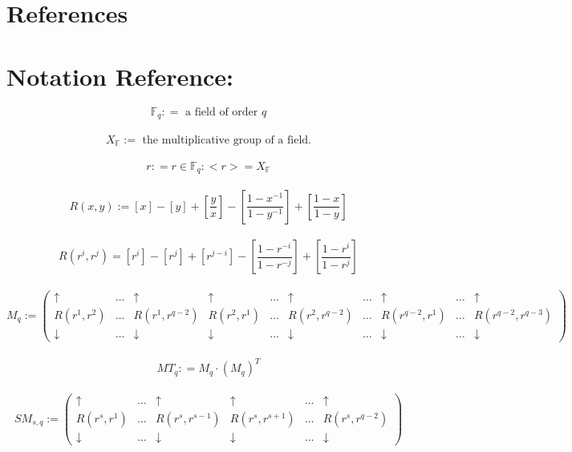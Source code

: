 \documentclass[11pt]{article}
\theoremstyle{plain}
\theoremstyle{definition}
\begin{document}
\pagebreak
\section{References}\label{section:References}




\pagebreak
\section{Notation Reference: }\label{section:References}

\begin{equation*}
\mathbb{F}_q : = \text{ a field of order }q
\end{equation*}
\\
\begin{equation*}
X_\mathbb{F} := \text{ the multiplicative group of a field.}
\end{equation*}
\\
\begin{equation*}
r: = r\in \mathbb{F}_q : <r>=X_\mathbb{F}
\end{equation*}
\\
\begin{equation*}
R(x,y):= [x] - [y] + [\frac{y}{x}] - [\frac{1-x^{-1}}{1-y^{-1}}] + [\frac{1-x}{1-y}]
\end{equation*}
\\
\begin{equation*}
R(r^{i},r^{j}) = [r^{i}] - [r^{j}] + [r^{j-i}] - [\frac{1-r^{-i}}{1-r^{-j}}] + [\frac{1-r^{i}}{1-r^{j}}]
\end{equation*}
\\
\[ M_q := \left( \begin{array}{ccccccccccc}
\uparrow  & \dots  & \uparrow &  \uparrow &   \dots &  \uparrow & \dots  & \uparrow  & \dots & \uparrow \\
R(r^1, r^2) &   \dots &  R(r^1, r^{q-2}) & R(r^2, r^1)  & \dots & R(r^2, r^{q-2}) & \dots &  R(r^{q-2}, r^1) & \dots & R(r^{q-2}, r^{q-3})  \\
\downarrow  & \dots  & \downarrow &  \downarrow  & \dots &  \downarrow & \dots  & \downarrow & \dots & \downarrow \end{array} \right)\] 
\\
\begin{equation*}
MT_q : = M_q \cdot (M_q) ^T
\end{equation*}
\\
\[ SM_{s,q} := \left( \begin{array}{cccccc}
\uparrow  & \dots  & \uparrow & \uparrow  & \dots  & \uparrow\\
R(r^s, r^1) &   \dots & R(r^s, r^{s-1}) &    R(r^s, r^{s+1}) &   \dots &  R(r^s, r^{q-2})  \\
\downarrow  & \dots  & \downarrow & \downarrow  & \dots  & \downarrow   \end{array} \right)\] 
\end{document}
